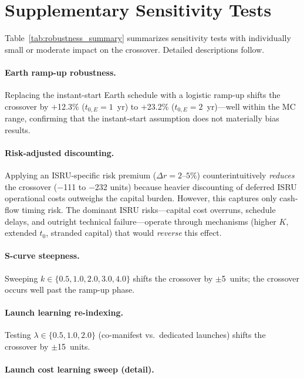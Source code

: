 \section{Supplementary Sensitivity Tests}
\label{sec:appendix_sensitivity}

Table~\ref{tab:robustness_summary} summarizes sensitivity tests with individually small or moderate impact on the crossover. Detailed descriptions follow.



\paragraph{Earth ramp-up robustness.}
\label{sec:earth_ramp}
Replacing the instant-start Earth schedule with a logistic ramp-up shifts the crossover by $+$12.3\% ($t_{0,E} = 1$~yr) to $+$23.2\% ($t_{0,E} = 2$~yr)---well within the MC range, confirming that the instant-start assumption does not materially bias results.

\paragraph{Risk-adjusted discounting.}
\label{sec:risk_premium}
Applying an ISRU-specific risk premium ($\Delta r = 2$--$5\%$) counterintuitively \emph{reduces} the crossover ($-$111 to $-$232 units) because heavier discounting of deferred ISRU operational costs outweighs the capital burden. However, this captures only cash-flow timing risk. The dominant ISRU risks---capital cost overruns, schedule delays, and outright technical failure---operate through mechanisms (higher $K$, extended $t_0$, stranded capital) that would \emph{reverse} this effect.

\paragraph{S-curve steepness.} Sweeping $k \in \{0.5, 1.0, 2.0, 3.0, 4.0\}$ shifts the crossover by $\pm$5~units; the crossover occurs well past the ramp-up phase.

\paragraph{Launch learning re-indexing.} Testing $\lambda \in \{0.5, 1.0, 2.0\}$ (co-manifest vs.\ dedicated launches) shifts the crossover by $\pm$15~units.

\paragraph{Launch cost learning sweep (detail).}

